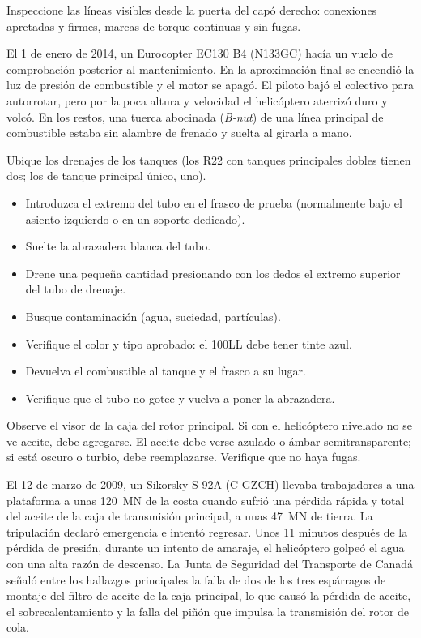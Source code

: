 Inspeccione las líneas visibles desde la puerta del capó derecho: conexiones apretadas y firmes, marcas de torque continuas y sin fugas.

\begin{caso}
El 1 de enero de 2014, un Eurocopter EC130 B4 (N133GC) hacía un vuelo de comprobación posterior al mantenimiento. En la aproximación final se encendió la luz de presión de combustible y el motor se apagó. El piloto bajó el colectivo para autorrotar, pero por la poca altura y velocidad el helicóptero aterrizó duro y volcó. En los restos, una tuerca abocinada (\emph{B-nut}) de una línea principal de combustible estaba sin alambre de frenado y suelta al girarla a mano.
\end{caso}

Ubique los drenajes de los tanques (los R22 con tanques principales dobles tienen dos; los de tanque principal único, uno).
\begin{itemize}
\item Introduzca el extremo del tubo en el frasco de prueba (normalmente bajo el asiento izquierdo o en un soporte dedicado).
\item Suelte la abrazadera blanca del tubo.
\item Drene una pequeña cantidad presionando con los dedos el extremo superior del tubo de drenaje.
\item Busque contaminación (agua, suciedad, partículas).
\item Verifique el color y tipo aprobado: el 100LL debe tener tinte azul.
\item Devuelva el combustible al tanque y el frasco a su lugar.
\item Verifique que el tubo no gotee y vuelva a poner la abrazadera.
\end{itemize}

Observe el visor de la caja del rotor principal. Si con el helicóptero nivelado no se ve aceite, debe agregarse. El aceite debe verse azulado o ámbar semitransparente; si está oscuro o turbio, debe reemplazarse. Verifique que no haya fugas.

\begin{caso}
El 12 de marzo de 2009, un Sikorsky S-92A (C-GZCH) llevaba trabajadores a una plataforma a unas 120~MN de la costa cuando sufrió una pérdida rápida y total del aceite de la caja de transmisión principal, a unas 47~MN de tierra. La tripulación declaró emergencia e intentó regresar. Unos 11 minutos después de la pérdida de presión, durante un intento de amaraje, el helicóptero golpeó el agua con una alta razón de descenso. La Junta de Seguridad del Transporte de Canadá señaló entre los hallazgos principales la falla de dos de los tres espárragos de montaje del filtro de aceite de la caja principal, lo que causó la pérdida de aceite, el sobrecalentamiento y la falla del piñón que impulsa la transmisión del rotor de cola.
\end{caso}

